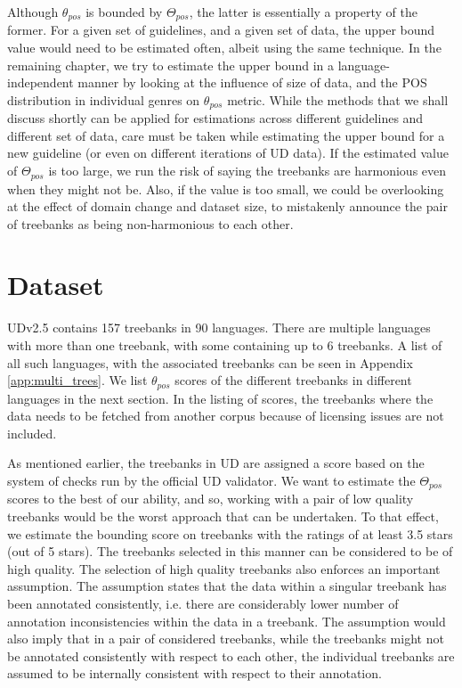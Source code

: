 Although \(\theta_{pos}\) is bounded by \(\Theta_{pos}\), the latter is essentially a property of the former. For a given set of guidelines, and a given set of data, the upper bound value would need to be estimated often, albeit using the same technique. In the remaining chapter, we try to estimate the upper bound in a language-independent manner by looking at the influence of size of data, and the POS distribution in individual genres on \(\theta_{pos}\) metric. While the methods that we shall discuss shortly can be applied for estimations across different guidelines and different set of data, care must be taken while estimating the upper bound for a new guideline (or even on different iterations of UD data). If the estimated value of \(\Theta_{pos}\) is too large, we run the risk of saying the treebanks are harmonious even when they might not be. Also, if the value is too small, we could be overlooking at the effect of domain change and dataset size, to mistakenly announce the pair of treebanks as being non-harmonious to each other.

\section{Dataset}
\label{sec:pos-harmony-dataset}

UDv2.5 \citep{UDv2.5} contains 157 treebanks in 90 languages. There are multiple languages with more than one treebank, with some containing up to 6 treebanks. A list of all such languages, with the associated treebanks can be seen in Appendix \ref{app:multi_trees}. We list \(\theta_{pos}\) scores of the different treebanks in different languages in the next section. In the listing of scores, the treebanks where the data needs to be fetched from another corpus because of licensing issues are not included.

As mentioned earlier, the treebanks in UD are assigned a score based on the system of checks run by the official UD validator. We want to estimate the \(\Theta_{pos}\) scores to the best of our ability, and so, working with a pair of low quality treebanks would be the worst approach that can be undertaken. To that effect, we estimate the bounding score on treebanks with the ratings of at least 3.5 stars (out of 5 stars). The treebanks selected in this manner can be considered to be of high quality. The selection of high quality treebanks also enforces an important assumption. The assumption states that the data within a singular treebank has been annotated consistently, i.e. there are considerably lower number of annotation inconsistencies within the data in a treebank. The assumption would also imply that in a pair of considered treebanks, while the treebanks might not be annotated consistently with respect to each other, the individual treebanks are assumed to be internally consistent with respect to their annotation.

